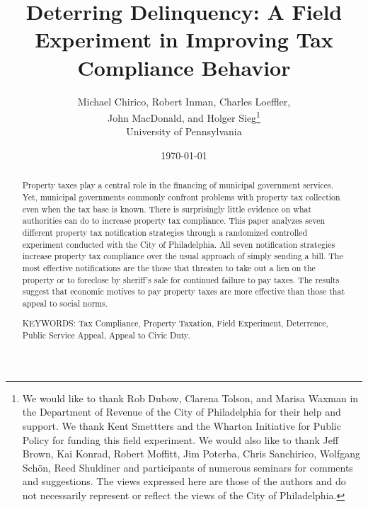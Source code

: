 \documentclass[12pt]{article}
\renewcommand{\thefootnote}{\fnsymbol{footnote}}
\begin{document}
\title{Deterring Delinquency: A Field Experiment in Improving Tax Compliance Behavior}

\author{Michael Chirico, Robert Inman, Charles Loeffler, \\ 
John MacDonald, and Holger Sieg\thanks{We would like to thank Rob Dubow,
    Clarena Tolson, and Marisa Waxman in the Department of Revenue of
    the City of Philadelphia for their help and support. We thank Kent
    Smettters and the Wharton Initiative for Public Policy for funding
    this field experiment. We would also like to thank Jeff Brown, Kai
    Konrad, Robert Moffitt, Jim Poterba, Chris Sanchirico, Wolfgang
    Sch\"on, Reed Shuldiner and participants of numerous seminars for
    comments and suggestions. The views expressed here are those of
    the authors and do not necessarily represent or reflect the views
    of the City of Philadelphia.}  \\ 
University of Pennsylvania}

\date{\today}

\maketitle

\begin{abstract}

Property taxes play a central role in the financing of municipal
government services. Yet, municipal governments commonly confront
problems with property tax collection even when the tax base is known.
There is surprisingly little evidence on what authorities can do to
increase property tax compliance.  This paper analyzes seven different
property tax notification strategies through a randomized controlled
experiment conducted with the City of Philadelphia.  All seven
notification strategies increase property tax compliance over the
usual approach of simply sending a bill.  The most effective
notifications are the those that threaten to take out a lien on the
property or to foreclose by sheriff's sale for continued failure to
pay taxes.  The results suggest that economic motives to pay property
taxes are more effective than those that appeal to social norms.

\bigskip

\noindent KEYWORDS: Tax Compliance, Property Taxation, Field
Experiment, Deterrence, Public Service Appeal, Appeal to Civic Duty.

\end{abstract}
\renewcommand{\thefootnote}{\arabic{footnote}}
\end{document}
